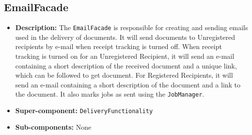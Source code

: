 \documentclass[a4paper,10pt]{article}
\begin{document}
\subsection{EmailFacade}
\begin{itemize}
    \item \textbf{Description:} The \texttt{EmailFacade} is responsible for creating and sending emails used in the delivery of documents. It will send documents to  Unregistered recipients by e-mail when receipt tracking is turned off. When receipt tracking is turned on for an Unregistered Recipient, it will send an e-mail containing a short description of the received document and a unique link, which can be followed to get document. For Registered Recipients, it will send an e-mail containing a short description of the document and a link to the document. It also marks jobs as sent using the \texttt{JobManager}.
    \item \textbf{Super-component:} \texttt{DeliveryFunctionality}
    \item \textbf{Sub-components:} None
\end{itemize}
\end{document}
